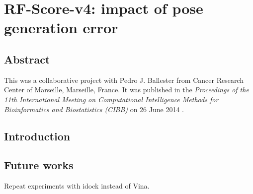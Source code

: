 \chapter{RF-Score-v4: impact of pose generation error}

\section{Abstract}

This was a collaborative project with Pedro J. Ballester from Cancer Research Center of Marseille, Marseille, France. It was published in the \textit{Proceedings of the 11th International Meeting on Computational Intelligence Methods for Bioinformatics and Biostatistics (CIBB)} on 26 June 2014 \citep{1434}.

\section{Introduction}



\section{Future works}

Repeat experiments with idock instead of Vina.

\chapterend
